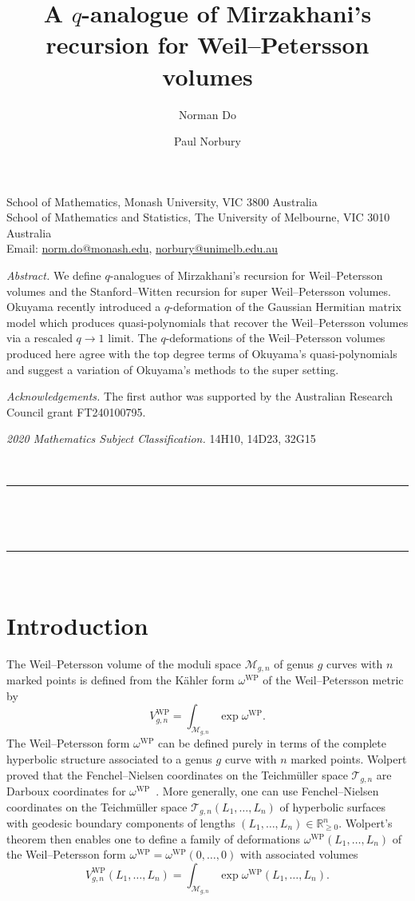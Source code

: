 \documentclass[a4paper]{article}
\title{A $q$-analogue of Mirzakhani's recursion for Weil--Petersson volumes}
\author{Norman Do \and Paul Norbury}
\theoremstyle{plain}
\theoremstyle{definition}
\renewcommand{\geq}{\geqslant}
\newcommand{\T}{\mathcal{T}}
\newcommand{\modm}{\mathcal{M}}
\newcommand{\br}{\mathbb{R}}
\begin{document}
\makeatletter
\textbf{\large \thetitle}

\textbf{\theauthor}
\makeatother

School of Mathematics, Monash University, VIC 3800 Australia \\
School of Mathematics and Statistics, The University of Melbourne, VIC 3010 Australia \\
Email: \href{mailto:norm.do@monash.edu}{norm.do@monash.edu}, \href{mailto:norbury@unimelb.edu.au}{norbury@unimelb.edu.au}


{\em Abstract.} We define $q$-analogues of Mirzakhani's recursion for Weil--Petersson volumes and the Stanford--Witten recursion for super Weil--Petersson volumes. Okuyama recently introduced a $q$-deformation of the Gaussian Hermitian matrix model which produces quasi-polynomials that recover the Weil--Petersson volumes via a rescaled $q \to 1$ limit. The $q$-deformations of the Weil--Petersson volumes produced here agree with the top degree terms of Okuyama's quasi-polynomials and suggest a variation of Okuyama's methods to the super setting.


\emph{Acknowledgements.} The first author was supported by the Australian Research Council grant FT240100795.


\emph{2020 Mathematics Subject Classification.} 14H10, 14D23, 32G15


~

\hrule

~

\tableofcontents

~

\hrule

~



\section{Introduction} \label{sec:introduction}

The Weil--Petersson volume of the moduli space $\modm_{g,n}$ of genus $g$ curves with $n$ marked points is defined from the K\"ahler form $\omega^{\mathrm{WP}}$ of the Weil--Petersson metric by
\[
V^{\mathrm{WP}}_{g,n} = \int_{\modm_{g,n}} \!\! \exp \omega^{\mathrm{WP}}.
\]
The Weil--Petersson form $\omega^{\mathrm{WP}}$ can be defined purely in terms of the complete hyperbolic structure associated to a genus $g$ curve with $n$ marked points. Wolpert proved that the Fenchel--Nielsen coordinates on the Teichm\"uller space $\T_{g,n}$ are Darboux coordinates for $\omega^{\mathrm{WP}}$~\cite{WolWei}. More generally, one can use Fenchel--Nielsen coordinates on the Teichm\"uller space $\T_{g,n}(L_1, \ldots, L_n)$ of hyperbolic surfaces with geodesic boundary components of lengths $(L_1, \ldots, L_n) \in\br_{\geq 0}^n$. Wolpert's theorem then enables one to define a family of deformations $\omega^{\mathrm{WP}}(L_1, \ldots, L_n)$ of the Weil--Petersson form $\omega^{\mathrm{WP}}=\omega^{\mathrm{WP}}(0, \ldots, 0)$ with associated volumes 
\[
V^{\mathrm{WP}}_{g,n}(L_1, \ldots, L_n)=\int_{\modm_{g,n}} \!\! \exp\omega^{\mathrm{WP}}(L_1, \ldots, L_n).
\]
\end{document}
